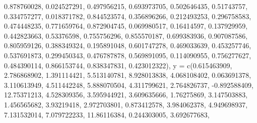 \documentclass[
  11pt,
]{article}
\newenvironment{Shaded}{\begin{snugshade}}{\end{snugshade}}
\newcommand{\AttributeTok}[1]{\textcolor[rgb]{0.40,0.45,0.13}{#1}}
\newcommand{\FloatTok}[1]{\textcolor[rgb]{0.68,0.00,0.00}{#1}}
\newcommand{\FunctionTok}[1]{\textcolor[rgb]{0.28,0.35,0.67}{#1}}
\newcommand{\NormalTok}[1]{\textcolor[rgb]{0.00,0.23,0.31}{#1}}
\newcommand{\SpecialCharTok}[1]{\textcolor[rgb]{0.37,0.37,0.37}{#1}}
\begin{document}
\begin{Shaded}
\begin{Highlighting}[]
        \FloatTok{0.878760028}\NormalTok{, }\FloatTok{0.024527291}\NormalTok{, }\FloatTok{0.497956215}\NormalTok{, }\FloatTok{0.693973705}\NormalTok{, }\FloatTok{0.502646435}\NormalTok{, }\FloatTok{0.51743757}\NormalTok{, }
        \FloatTok{0.334757277}\NormalTok{, }\FloatTok{0.018371782}\NormalTok{, }\FloatTok{0.844523574}\NormalTok{, }\FloatTok{0.356896266}\NormalTok{, }\FloatTok{0.212493253}\NormalTok{, }\FloatTok{0.296758583}\NormalTok{, }
        \FloatTok{0.474448235}\NormalTok{, }\FloatTok{0.771659764}\NormalTok{, }\FloatTok{0.872904745}\NormalTok{, }\FloatTok{0.069980517}\NormalTok{, }\FloatTok{0.16414597}\NormalTok{, }\FloatTok{0.137929959}\NormalTok{, }
        \FloatTok{0.442823663}\NormalTok{, }\FloatTok{0.53376598}\NormalTok{, }\FloatTok{0.755756296}\NormalTok{, }\FloatTok{0.855570187}\NormalTok{, }\FloatTok{0.699383936}\NormalTok{, }\FloatTok{0.907087586}\NormalTok{, }
        \FloatTok{0.805959126}\NormalTok{, }\FloatTok{0.388349324}\NormalTok{, }\FloatTok{0.195891048}\NormalTok{, }\FloatTok{0.601747278}\NormalTok{, }\FloatTok{0.469033639}\NormalTok{, }\FloatTok{0.453257746}\NormalTok{, }
        \FloatTok{0.537691873}\NormalTok{, }\FloatTok{0.299450343}\NormalTok{, }\FloatTok{0.476787878}\NormalTok{, }\FloatTok{0.569891095}\NormalTok{, }\FloatTok{0.114090955}\NormalTok{, }\FloatTok{0.756277627}\NormalTok{, }
        \FloatTok{0.484390114}\NormalTok{, }\FloatTok{0.866153744}\NormalTok{, }\FloatTok{0.838347831}\NormalTok{, }\FloatTok{0.423012322}\NormalTok{),}
  \AttributeTok{y =} \FunctionTok{c}\NormalTok{(}\FloatTok{0.615463909}\NormalTok{, }\FloatTok{2.786868902}\NormalTok{, }\FloatTok{1.391114421}\NormalTok{, }\FloatTok{5.513140781}\NormalTok{, }\FloatTok{8.928013838}\NormalTok{, }\FloatTok{4.068108402}\NormalTok{,}
        \FloatTok{0.063691378}\NormalTok{, }\FloatTok{3.110613949}\NormalTok{, }\FloatTok{4.511442248}\NormalTok{, }\FloatTok{5.888070504}\NormalTok{, }\FloatTok{4.311799621}\NormalTok{, }\FloatTok{2.764826737}\NormalTok{,}
        \SpecialCharTok{{-}}\FloatTok{0.892588409}\NormalTok{, }\FloatTok{12.75371213}\NormalTok{, }\FloatTok{4.528309356}\NormalTok{, }\FloatTok{3.595944921}\NormalTok{, }\FloatTok{3.609635666}\NormalTok{, }\FloatTok{1.76275869}\NormalTok{,}
        \FloatTok{3.147503883}\NormalTok{, }\FloatTok{1.456565682}\NormalTok{, }\FloatTok{3.93219418}\NormalTok{, }\FloatTok{2.972703801}\NormalTok{, }\FloatTok{0.873412578}\NormalTok{, }\FloatTok{3.984062378}\NormalTok{,}
        \FloatTok{4.949698937}\NormalTok{, }\FloatTok{7.131532014}\NormalTok{, }\FloatTok{7.079722233}\NormalTok{, }\FloatTok{11.86116384}\NormalTok{, }\FloatTok{0.244303005}\NormalTok{, }\FloatTok{3.692677683}\NormalTok{,}

\end{Highlighting}
\end{Shaded}
\end{document}

